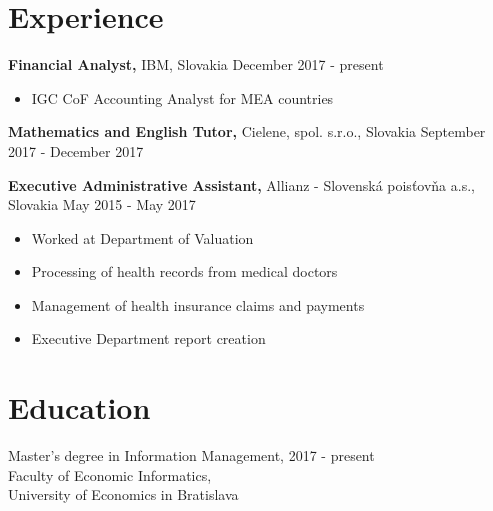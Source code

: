 \documentclass[margin]{res}
\begin{document}

\address{{\bf Permanent Address} \\ Dobrianskeho 1597/49 \\ 093 01 Vranov nad Top\v{l}ou \\ Slovakia \\
        +421 908 274 464 \\ zuzana@kosalko.sk \\ linkedin.com/in/zuzana-kosalkova}


\begin{resume}


\section{Experience}

{\bf Financial Analyst,} IBM, Slovakia \hfill December 2017 - present
\begin{itemize} \itemsep -2pt %
\item IGC CoF Accounting Analyst for MEA countries
\end{itemize}

{\bf Mathematics and English Tutor,} Cielene, spol. s.r.o., Slovakia \hfill September 2017 - December 2017

{\bf Executive Administrative Assistant,} Allianz - Slovensk\'{a} pois\v{t}ov\v{n}a a.s., Slovakia \hfill May 2015 - May 2017
\begin{itemize} \itemsep -2pt %
\item Worked at Department of Valuation
\item Processing of health records from medical doctors
\item Management of health insurance claims and payments
\item Executive Department report creation
\end{itemize}

\section{Education}
Master's degree in Information Management, \hfill 2017 - present \\
Faculty of Economic Informatics, \\
University of Economics in Bratislava


\end{resume}
\end{document}
